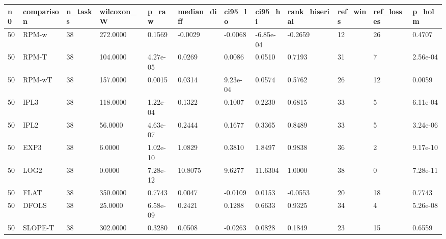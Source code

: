 \begin{tabular}{llllllllllll}
\hline
n0 & comparison & n\_tasks & wilcoxon\_W & p\_raw & median\_diff & ci95\_lo & ci95\_hi & rank\_biserial & ref\_wins & ref\_losses & p\_holm \\
\hline
50 & RPM-w & 38 & 272.0000 & 0.1569 & -0.0029 & -0.0068 & -6.85e-04 & -0.2659 & 12 & 26 & 0.4707 \\
50 & RPM-T & 38 & 104.0000 & 4.27e-05 & 0.0269 & 0.0086 & 0.0510 & 0.7193 & 31 & 7 & 2.56e-04 \\
50 & RPM-wT & 38 & 157.0000 & 0.0015 & 0.0314 & 9.23e-04 & 0.0574 & 0.5762 & 26 & 12 & 0.0059 \\
50 & IPL3 & 38 & 118.0000 & 1.22e-04 & 0.1322 & 0.1007 & 0.2230 & 0.6815 & 33 & 5 & 6.11e-04 \\
50 & IPL2 & 38 & 56.0000 & 4.63e-07 & 0.2444 & 0.1677 & 0.3365 & 0.8489 & 33 & 5 & 3.24e-06 \\
50 & EXP3 & 38 & 6.0000 & 1.02e-10 & 1.0829 & 0.3810 & 1.8497 & 0.9838 & 36 & 2 & 9.17e-10 \\
50 & LOG2 & 38 & 0.0000 & 7.28e-12 & 10.8075 & 9.6277 & 11.6304 & 1.0000 & 38 & 0 & 7.28e-11 \\
50 & FLAT & 38 & 350.0000 & 0.7743 & 0.0047 & -0.0109 & 0.0153 & -0.0553 & 20 & 18 & 0.7743 \\
50 & DFOLS & 38 & 25.0000 & 6.58e-09 & 0.2421 & 0.1288 & 0.6633 & 0.9325 & 34 & 4 & 5.26e-08 \\
50 & SLOPE-T & 38 & 302.0000 & 0.3280 & 0.0508 & -0.0263 & 0.0828 & 0.1849 & 23 & 15 & 0.6559 \\
\hline
\end{tabular}
